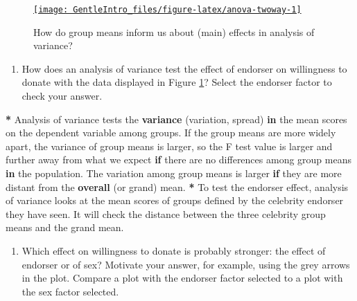 \documentclass[a4paper]{book}
\newenvironment{Shaded}{\begin{snugshade}}{\end{snugshade}}
\newcommand{\KeywordTok}[1]{\textcolor[rgb]{0,0,0}{\textbf{#1}}}
\newcommand{\StringTok}[1]{\textcolor[rgb]{0.00,0.00,0.00}{#1}}
\newcommand{\ControlFlowTok}[1]{\textcolor[rgb]{0.00,0.00,0.00}{\textbf{#1}}}
\newcommand{\OperatorTok}[1]{\textcolor[rgb]{0.00,0.00,0.00}{\textbf{#1}}}
\newcommand{\NormalTok}[1]{#1}
\providecommand{\tightlist}{%
  \setlength{\itemsep}{0pt}\setlength{\parskip}{0pt}}
\theoremstyle{definition}
\theoremstyle{definition}
\theoremstyle{definition}
\theoremstyle{remark}
\begin{document}
\begin{figure}[H]
\href{http://82.196.4.233:3838/apps/anova-twoway/}{\texttt{[image: GentleIntro\_files/figure-latex/anova-twoway-1]} }\caption{How do group means inform us about (main) effects in analysis of variance?}\label{fig:anova-twoway}
\end{figure}

\begin{enumerate}
\def\labelenumi{\arabic{enumi}.}
\tightlist
\item
  How does an analysis of variance test the effect of endorser on
  willingness to donate with the data displayed in Figure
  \ref{fig:anova-twoway}? Select the endorser factor to check your
  answer.
\end{enumerate}

\begin{Shaded}
\begin{Highlighting}[]
\OperatorTok{*}\StringTok{ }\NormalTok{Analysis of variance tests the }\KeywordTok{variance}\NormalTok{ (variation, spread) }\ControlFlowTok{in}\NormalTok{ the mean}
\NormalTok{scores on the dependent variable among groups. If the group means are more widely}
\NormalTok{apart, the variance of group means is larger, so the F test value is larger and}
\NormalTok{further away from what we expect }\ControlFlowTok{if}\NormalTok{ there are no differences among group means}
\ControlFlowTok{in}\NormalTok{ the population. The variation among group means is larger }\ControlFlowTok{if}\NormalTok{ they are more}
\NormalTok{distant from the }\KeywordTok{overall}\NormalTok{ (or grand) mean.}
\OperatorTok{*}\StringTok{ }\NormalTok{To test the endorser effect, analysis of variance looks at the mean scores of}
\NormalTok{groups defined by the celebrity endorser they have seen. It will check the}
\NormalTok{distance between the three celebrity group means and the grand mean.}
\end{Highlighting}
\end{Shaded}

\begin{enumerate}
\def\labelenumi{\arabic{enumi}.}
\setcounter{enumi}{1}
\tightlist
\item
  Which effect on willingness to donate is probably stronger: the effect
  of endorser or of sex? Motivate your answer, for example, using the
  grey arrows in the plot. Compare a plot with the endorser factor
  selected to a plot with the sex factor selected.
\end{enumerate}
\end{document}
